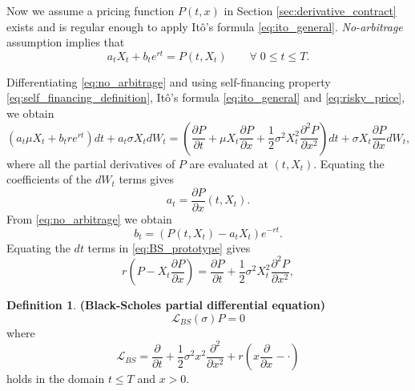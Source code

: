 \documentclass[a4paper,12pt]{article}
\numberwithin{equation}{section}
\theoremstyle{definition}
\newtheorem{definition}{Definition}[section]
\theoremstyle{remark}
\begin{document}
Now we assume a pricing function $P(t,x)$ in 
Section \ref{sec:derivative_contract} exists and is regular 
enough to apply It\^o's formula \eqref{eq:ito_general}. 
\textit{No-arbitrage} assumption implies that 
\begin{equation}
\label{eq:no_arbitrage}
    a_t X_t + b_t e^{rt} = P(t,X_t)\qquad \forall\;0\leq t \leq T.
\end{equation}

Differentiating \eqref{eq:no_arbitrage} and using self-financing 
property \eqref{eq:self_financing_definition}, It\^o's formula \eqref{eq:ito_general} 
and \eqref{eq:risky_price}, we obtain 
\begin{equation}
\label{eq:BS_prototype}
    (a_{t}\mu X_{t}+b_{t}re^{rt})dt+a_{t}\sigma X_{t}dW_{t}
    =\left(\frac{\partial P}{\partial t}
    +\mu X_{t}\frac{\partial P}{\partial x} + \frac{1}{2}\sigma^{2}X_{t}^{2}\frac{\partial^{2} P}{\partial {x}^{2}}
    \right)dt + \sigma X_{t}\frac{\partial P}{\partial x}dW_{t},
\end{equation}
where all the partial derivatives of $P$ are evaluated at $(t,X_t)$. 
Equating the coefficients of the $dW_{t}$ terms gives 
\begin{equation}
\label{eq:risky_asset_weight}
    a_{t}=\frac{\partial P}{\partial x}(t,X_t).
\end{equation}
From \eqref{eq:no_arbitrage} we obtain 
\begin{equation}
\label{eq:riskless_asset_weight}
    b_{t}=(P(t,X_{t})-a_{t}X_{t})e^{-rt}.
\end{equation}
Equating the $dt$ terms in \eqref{eq:BS_prototype} gives 
\begin{equation}
\label{eq:bs_pde_0}
    r\left(P-X_{t}\frac{\partial P}{\partial x}\right)
    =\frac{\partial P}{\partial t}+\frac{1}{2}\sigma^{2}X_{t}^{2}\frac{\partial^{2} P}{\partial {x}^{2}},
\end{equation}

\begin{definition}
\textbf{(Black-Scholes partial differential equation)}
\begin{equation}
\label{eq:BS_pde}
    \mathcal{L}_{BS}(\sigma)P=0
\end{equation}
where 
\begin{equation}
\label{eq:BS_op}
    \mathcal{L}_{BS}=\frac{\partial }{\partial t}
    +\frac{1}{2}\sigma^{2}x^{2}\frac{\partial^{2} }{\partial {x}^{2}}
    +r\left(x\frac{\partial }{\partial x}-\cdot\right)
\end{equation}
holds in the domain $t\leq T$ and $x>0$.
\end{definition}
\end{document}

